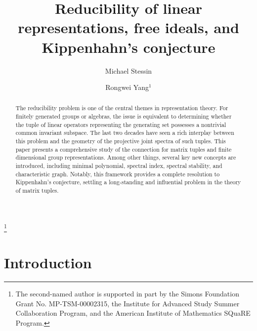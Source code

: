 \documentclass[draft, 12pt, reqno]{amsart}
\numberwithin{equation}{section}
\theoremstyle{plain}
\begin{document}
\title[Cayley-Hamilton ideals and reducible representations]{Reducibility of linear representations, free ideals, and Kippenhahn's conjecture}
\author{Michael Stessin}
\address{Department of Mathematics and Statistics \\
University at Albany, SUNY \\
Albany, NY 12222}
\author{Rongwei Yang$^1$} 
\address{Department of Mathematics and Statistics \\
 University at Albany, SUNY \\
Albany, NY 12222}

\begin{abstract}
The reducibility problem is one of the central themes in representation theory. For finitely generated groups or algebras, the issue is equivalent to determining whether the tuple of linear operators representing the generating set possesses a nontrivial common invariant subspace. The last two decades have seen a rich interplay between this problem and the geometry of the projective joint spectra of such tuples. This paper presents a comprehensive study of the connection for matrix tuples and finite dimensional group representations. Among other things, several key new concepts are introduced, including minimal polynomial, spectral index, spectral stability, and characteristic graph. Notably, this framework provides a complete resolution to Kippenhahn’s conjecture, settling a long-standing and influential problem in the theory of matrix tuples.
\end{abstract}
\footnote{The second-named author is supported in part by the Simons Foundation Grant No. MP-TSM-00002315, the Institute for Advanced Study Summer Collaboration Program, and the American Institute of Mathematics SQuaRE Program.}

\maketitle

\section{Introduction}
\end{document}
